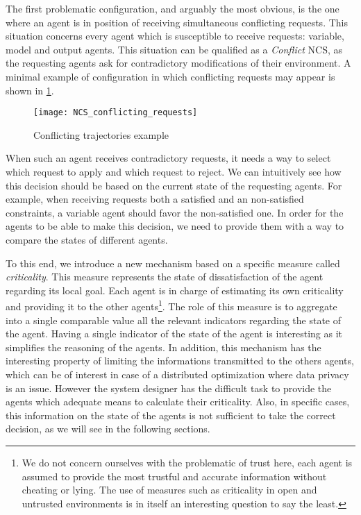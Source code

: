 The first problematic configuration, and arguably the most obvious, is the one where an agent is in position of receiving simultaneous conflicting requests. This situation concerns every agent which is susceptible to receive requests: variable, model and output agents. This situation can be qualified as a \emph{Conflict} NCS, as the requesting agents ask for contradictory modifications of their environment. A minimal example of configuration in which conflicting requests may appear is shown in \figurename{} \ref{NCS_conflicting_requests}.

\begin{figure}
\centering
\texttt{[image: NCS\_conflicting\_requests]}
\caption{Conflicting trajectories example}\label{NCS_conflicting_requests}
\end{figure}

When such an agent receives contradictory requests, it needs a way to select which request to apply and which request to reject. We can intuitively see how this decision should be based on the current state of the requesting agents. For example, when receiving requests both a satisfied and an non-satisfied constraints, a variable agent should favor the non-satisfied one. In order for the agents to be able to make this decision, we need to provide them with a way to compare the states of different agents.

To this end, we introduce a new mechanism based on a specific measure called \emph{criticality}. This measure represents the state of dissatisfaction of the agent regarding its local goal. Each agent is in charge of estimating its own criticality and providing it to the other agents\footnote{We do not concern ourselves with the problematic of trust here, each agent is assumed to provide the most trustful and accurate information without cheating or lying. The use of measures such as criticality in open and untrusted environments is in itself an interesting question to say the least.}. The role of this measure is to aggregate into a single comparable value all the relevant indicators regarding the state of the agent. Having a single indicator of the state of the agent is interesting as it simplifies the reasoning of the agents. In addition, this mechanism has the interesting property of limiting the informations transmitted to the others agents, which can be of interest in case of a distributed optimization where data privacy is an issue.
However the system designer has the difficult task to provide the agents which adequate means to calculate their criticality. Also, in specific cases, this information on the state of the agents is not sufficient to take the correct decision, as we will see in the following sections.

